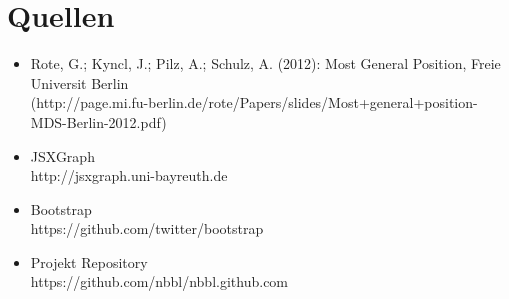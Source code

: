 \documentclass[a4paper,twocolumn]{scrartcl}
\begin{document}
\section{Quellen}

\begin{itemize}

\item Rote, G.; Kyncl, J.; Pilz, A.; Schulz, A. (2012): Most General Position, Freie Universit Berlin\\
(http://page.mi.fu-berlin.de/rote/Papers/slides/Most+general+position-MDS-Berlin-2012.pdf)

\item JSXGraph\\
 http://jsxgraph.uni-bayreuth.de

\item Bootstrap\\
https://github.com/twitter/bootstrap

\item Projekt Repository\\
https://github.com/nbbl/nbbl.github.com

\end{itemize}
\end{document}

